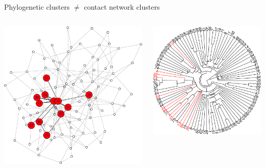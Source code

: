 \documentclass{beamer}
\begin{document}
\begin{frame}{Phylogenetic clusters $\neq$ contact network clusters}
    \begin{columns}
        \begin{column}{0.5\textwidth}
            \includegraphics[width=\textwidth]{ba-net}
        \end{column}
        \begin{column}{0.5\textwidth}
            \includegraphics[width=\textwidth]{ba-tree}
        \end{column}
    \end{columns}
\end{frame}
\end{document}
